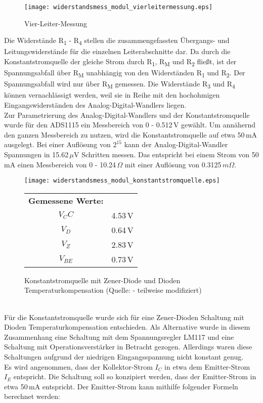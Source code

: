 \begin{figure}[h]
\centering
\vspace*{12pt}
\texttt{[image: widerstandsmess\_modul\_vierleitermessung.eps]}
\caption{Vier-Leiter-Messung}
\vspace*{12pt}
\end{figure}
\noindent
Die Widerstände R\textsubscript{1} - R\textsubscript{4} stellen die zusammengefassten Übergangs- und Leitungswiderstände für die einzelnen Leiterabschnitte dar. Da durch die Konstantstromquelle der gleiche Strom durch R\textsubscript{1}, R\textsubscript{M} und R\textsubscript{2} fließt, ist der Spannungsabfall über R\textsubscript{M} unabhängig von den Widerständen R\textsubscript{1} und R\textsubscript{2}. Der Spannungsabfall wird nur über R\textsubscript{M} gemessen. Die Widerstände R\textsubscript{3} und R\textsubscript{4} können vernachlässigt werden, weil sie in Reihe mit den hochohmigen Eingangswiderständen des Analog-Digital-Wandlers liegen.
\\
Zur Parametrierung des Analog-Digital-Wandlers und der Konstantstromquelle wurde für den ADS1115 ein Messbereich von 0 - 0.512\,V gewählt. Um annähernd den ganzen Messbereich zu nutzen, wird die Konstantstromquelle auf etwa 50\,mA ausgelegt. Bei einer Auflösung von \(2^{15}\) kann der Analog-Digital-Wandler Spannungen in 15.62\,\(\mu\)V Schritten messen. Das entspricht bei einem Strom von 50 mA einen Messbereich von 0 - 10.24\,\(\Omega\) mit einer Auflösung von 0.3125\,\(m\Omega\).
\begin{figure}[h!]
\centering
\texttt{[image: widerstandsmess\_modul\_konstantstromquelle.eps]}
\caption{Konstantstromquelle mit Zener-Diode und Dioden Temperaturkompensation (Quelle: \cite[][S. 73]{Horowitz1989} - teilweise modifiziert)}
\vspace{12pt}
	\begin{tabular}{c l}
	
 	\textbf{Gemessene Werte:}\\
	\(V_CC\) & 4.53\,V\\
	\(V_D\) & 0.64\,V\\
	\(V_Z\) & 2.83\,V\\
	\(V_{BE}\) & 0.73\,V\\
	\end{tabular}

\end{figure}
\\
\noindent
Für die Konstantstromquelle wurde sich für eine Zener-Dioden Schaltung mit Dioden Temperaturkompensation entschieden. Als Alternative wurde in diesem Zusammenhang eine Schaltung mit dem Spannungsregler LM117 und eine Schaltung mit Operationsverstärker in Betracht gezogen. Allerdings waren diese Schaltungen aufgrund der niedrigen Eingangsspannung nicht konstant genug.
\\
Es wird angenommen, dass der Kollektor-Strom \(I_C\) in etwa dem Emitter-Strom \(I_E\) entspricht. Die Schaltung soll so konzipiert werden, dass der Emitter-Strom in etwa 50\,mA entspricht. Der Emitter-Strom kann mithilfe folgender Formeln berechnet werden:

